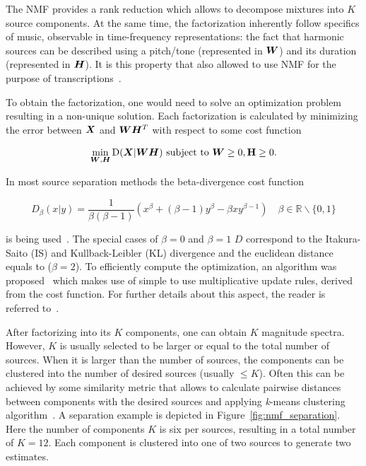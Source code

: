The NMF provides a rank reduction which allows to decompose mixtures into \(K\) source components.
At the same time, the factorization inherently follow specifics of music, observable in time-frequency representations: the fact that harmonic sources can be described using a pitch/tone (represented in \({\bm{W}}\)) and its duration (represented in \({\bm{H}}\)).
It is this property that also allowed to use NMF for the purpose of transcriptions~\cite{smaragdis03}.
\par
To obtain the factorization, one would need to solve an optimization problem resulting in a non-unique solution.
Each factorization is calculated by minimizing the error between \({\bm{X}}\) and \({\bm{W}} {\bm{H}}^{T}\) with respect to some cost function

\begin{equation}
  \min_{{\bm{W}},{\bm{H}}} \mathrm{D}({\bm{X}} | {\bm{W}} {\bm{H}}) \text { subject to } {\bm{W}} \geq 0 , \mathbf {{\bm{H}}} \geq 0.
\end{equation}

In most source separation methods the beta-divergence cost function

\begin{equation}
  D_{\beta} (x | y) = \frac { 1 } { \beta ( \beta - 1 ) } \left( x ^ { \beta } + ( \beta - 1 ) y ^ { \beta } - \beta x y ^ { \beta - 1 } \right) \quad \beta \in \mathbb { R } \backslash \{ 0, 1 \}
\end{equation}

is being used~\cite{fitzgerald08a}. 
The special cases of \(\beta = 0\) and \(\beta = 1\) \(D\) correspond to the Itakura-Saito (IS) and Kullback-Leibler (KL) divergence and the euclidean distance equals to (\(\beta = 2\)).
To efficiently compute the optimization, an algorithm was proposed~\cite{lee01} which makes use of simple to use multiplicative update rules, derived from the cost function.
For further details about this aspect, the reader is referred to~\cite{cichoki09}.
\par
After factorizing into its \(K\) components, one can obtain \(K\) magnitude spectra.
However, \(K\) is usually selected to be larger or equal to the total number of sources.
When it is larger than the number of sources, the components can be clustered into the number of desired sources (usually \(\leq K\)).
Often this can be achieved by some similarity metric that allows to calculate pairwise distances between components with the desired sources and applying \textit{k}-means clustering algorithm~\cite{spiertz09}.
A separation example is depicted in Figure~\ref{fig:nmf_separation}. 
Here the number of components \(K\) is six per sources, resulting in a total number of \(K=12\). 
Each component is clustered into one of two sources to generate two estimates.

